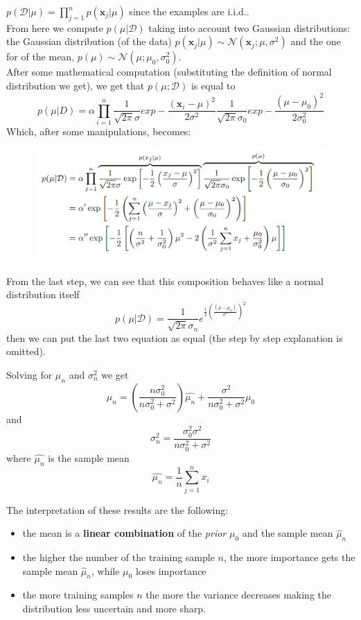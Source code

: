     $p(\mathcal{D}|\mu)=\prod_{j=1}^n p(\pmb{x}_j|\mu)$ since the examples are i.i.d..\\
    
    From here we compute $p(\mu|\mathcal{D})$ taking into account two Gaussian distributions: the Gaussian distribution (of the data) $p(\pmb{x}_j | \mu) \sim \mathcal{N}(\pmb{x}_j ; \mu, \sigma^2)$ and the one for of the mean, $p(\mu) \sim \mathcal{N}(\mu ; \mu_0, \sigma_{0}^2)$.\\
    After some mathematical computation (substituting the definition of normal distribution we get), we get that $p(\mu;\mathcal{D})$ is equal to
    $$p(\mu | D) = \alpha \prod_{i=1}^n \frac{1}{\sqrt{2 \pi} \sigma} \mathit{exp} - \frac{(\pmb{x}_i-\mu)^2}{2 \sigma^2} \frac{1}{\sqrt{2 \pi} \sigma_0} \mathit{exp} - \frac{(\mu - \mu_0)^2}{2 \sigma_0^2}$$
    Which, after some manipulations, becomes:
    \begin{figure}[H]
        \centering
        \includegraphics[scale=0.4]{images/bayesian_univariate_gaussian_inter_calculus.png}
    \end{figure}
    From the last step, we can see that this composition behaves like a normal distribution itself
    $$p(\mu|\mathcal{D}) = \frac{1}{\sqrt{2\pi}\sigma_n} e^{\frac{1}{2} (\frac{(\mu - \mu_n)}{\sigma^n})^2}$$
    then we can put the last two equation as equal (the step by step explanation is omitted). 
    
    Solving for $\mu_n$ and $\sigma_n^2$ we get
    $$\mu_n = \left( \frac{n\sigma_0^2}{n\sigma_0^2 + \sigma^2} \right)  \hat{\mu_n} + \frac{\sigma^2}{n\sigma_0^2 + \sigma^2} \mu_0$$
    and
    $$\sigma_n^2 = \frac{\sigma_0^2\sigma^2}{n\sigma_0^2 + \sigma^2}$$
    where $\hat{\mu_n}$ is the sample mean
    $$\hat{\mu_n} = \frac{1}{n} \sum_{j=1}^n x_i$$
    
    The interpretation of these results are the following:
    \begin{itemize}
        \item the mean is a \textbf{linear combination} of the \textit{prior} $\mu_0$ and the sample mean $\hat{\mu}_n$
        \item the higher the number of the training sample $n$, the more importance gets the sample mean $\hat{\mu}_n$, while $\mu_0$ loses importance
        \item the more training samples $n$ the more the variance decreases making the distribution less uncertain and more sharp.
    \end{itemize}
    
